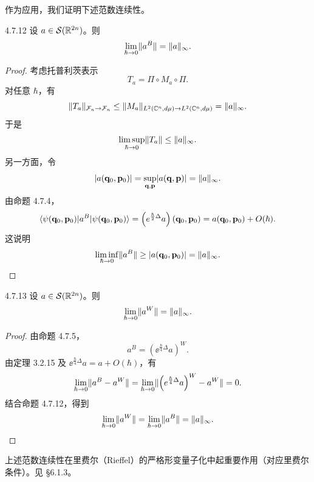 作为应用，我们证明下述范数连续性。

\begin{proposition}{4.7.12}
  设 $a\in\mathcal S(\mathbb{R}^{2n})$。则
  \[
  \lim_{\hbar\to0}\lVert a^B\rVert=\lVert a\rVert_\infty.
  \]
\end{proposition}

\begin{proof}
考虑托普利茨表示
\[
T_a=\Pi\circ M_a\circ\Pi.
\]
对任意 $\hbar$，有
\[
\lVert T_a\rVert_{\mathcal F_n\to\mathcal F_n}
\le\lVert M_a\rVert_{L^2(\mathbb{C}^n,d\mu)\to L^2(\mathbb{C}^n,d\mu)}
=\lVert a\rVert_\infty.
\]
于是
\[
\limsup_{\hbar\to0}\lVert T_a\rVert\le\lVert a\rVert_\infty.
\]
另一方面，令
\[
\lvert a(\mathbf q_0,\mathbf p_0)\rvert
=\sup_{\mathbf q,\mathbf p}\lvert a(\mathbf q,\mathbf p)\rvert
=\lVert a\rVert_\infty.
\]
由命题 4.7.4，
\[
\langle \psi(\mathbf q_0,\mathbf p_0)|a^B|\psi(\mathbf q_0,\mathbf p_0)\rangle
=\left(e^{\frac{\hbar}{2}\Delta}a\right)(\mathbf q_0,\mathbf p_0)
=a(\mathbf q_0,\mathbf p_0)+O(\hbar).
\]
这说明
\[
\liminf_{\hbar\to0}\lVert a^B\rVert
\ge\lvert a(\mathbf q_0,\mathbf p_0)\rvert=\lVert a\rVert_\infty.
\]
\end{proof}

\begin{proposition}{4.7.13}
  设 $a\in\mathcal S(\mathbb{R}^{2n})$。则
  \[
  \lim_{\hbar\to0}\lVert a^W\rVert=\lVert a\rVert_\infty.
  \]
\end{proposition}

\begin{proof}
由命题 4.7.5，
\[
a^B=\left(\ee^{\frac{\hbar}{4}\Delta}a\right)^W.
\]
由定理 3.2.15 及 $\ee^{\frac{\hbar}{4}\Delta}a=a+O(\hbar)$，有
\[
\lim_{\hbar\to0}\lVert a^B-a^W\rVert
=\lim_{\hbar\to0}\lVert \left(e^{\frac{\hbar}{4}\Delta}a\right)^W-a^W\rVert=0.
\]
结合命题 4.7.12，得到
\[
\lim_{\hbar\to0}\lVert a^W\rVert
=\lim_{\hbar\to0}\lVert a^B\rVert=\lVert a\rVert_\infty.
\]
\end{proof}

上述范数连续性在里费尔（Rieffel）的严格形变量子化中起重要作用（对应里费尔
条件）。见 §6.1.3。



